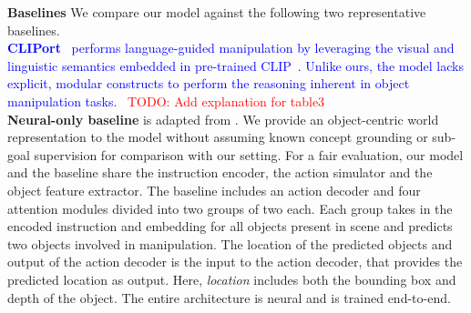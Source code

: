 \textbf{Baselines} We compare our model against the following two representative baselines. \\ 
%
\textcolor{blue}{
\textbf{CLIPort}~\cite{shridhar2022cliport} performs language-guided manipulation by leveraging the visual and linguistic semantics embedded in pre-trained CLIP~\cite{clip}. Unlike ours, the model lacks explicit, modular constructs to perform the reasoning inherent in object manipulation tasks.} ~\textcolor{red}{TODO: Add explanation for table3} \\ 
\textbf{Neural-only baseline} is adapted from \cite{andreas2016neural}. We provide an object-centric world representation to the model without assuming known concept grounding or sub-goal supervision for comparison with our setting. For a fair evaluation, our model and the baseline share the instruction encoder, the action simulator and the object feature extractor. The baseline includes an action decoder and four attention modules divided into two groups of two each. Each group takes in the encoded instruction and embedding for all objects present in scene and predicts two objects involved in manipulation. The location of the predicted objects and output of the action decoder is the input to the action decoder, that provides the predicted location as output. Here, \textit{location} includes both the bounding box and depth of the object. The entire architecture is neural and is trained end-to-end. %
